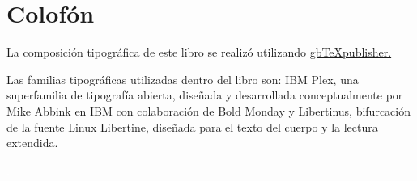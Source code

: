\chapter{Colofón}

La composición tipográfica de este libro se realizó utilizando \href{https://github.com/albertomoyano/gbtexpublisher}{gbTeXpublisher.}

Las familias tipográficas utilizadas dentro del libro son: IBM Plex, una superfamilia de tipografía abierta, diseñada y desarrollada conceptualmente por Mike Abbink en IBM con colaboración de Bold Monday y Libertinus, bifurcación de la fuente Linux Libertine, diseñada para el texto del cuerpo y la lectura extendida.

\ifPDF
\newpage
\thispagestyle{empty}
{\textcolor{white}{.}}
	\else
	\ifBLACKPDF
	\newpage
	\thispagestyle{empty}
	{\textcolor{white}{.}}
	\fi
\fi





